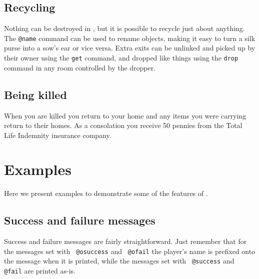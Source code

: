 \subsection{Recycling}
\label{sec:recycling}

Nothing can be destroyed in {\tinymud}, but it is possible to recycle
just about anything.  The {\tt @name} command can be used to rename
objects, making it easy to turn a silk purse into a sow's ear or vice
versa.  Extra exits can be unlinked and picked up by their owner using
the {\tt get} command, and dropped like things using the {\tt drop}
command in any room controlled by the dropper.

\subsection{Being killed}
\label{sec:being-killed}

When you are killed you return to your home and any items you were
carrying return to their homes.  As a consolation you receive 50
pennies from the {\tinymud} Total Life Indemnity insurance
company.

\section{Examples}
\label{sec:examples}

Here we present examples to demonstrate some of the features of
{\tinymud}.

\subsection{Success and failure messages}
\label{sec:success-and-failure-messages}

Success and failure messages are fairly straightforward.  Just
remember that for the messages set with {\tt
@osuccess} and {\tt
@ofail} the player's name is prefixed onto
the message when it is printed, while the messages set with {\tt
@success} and {\tt
@fail} are printed as-is.

